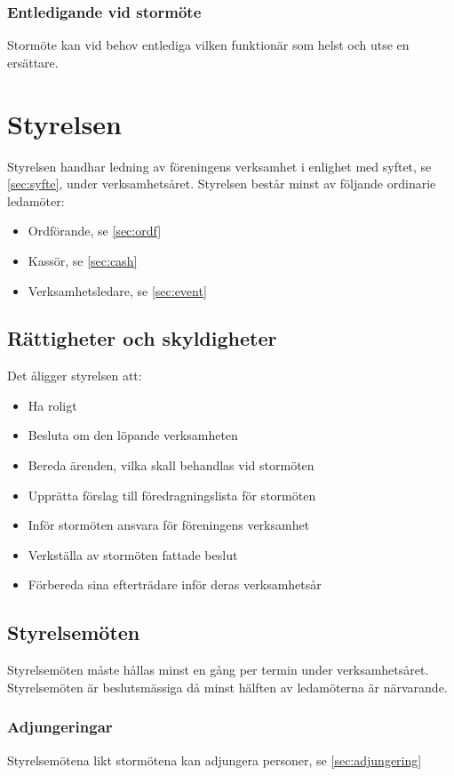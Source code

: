 \documentclass[11pt,a4paper]{article}
\begin{document}
\subsubsection{Entledigande vid stormöte}
Stormöte kan vid behov entlediga vilken funktionär som helst och utse en ersättare.

\section{Styrelsen}
Styrelsen handhar ledning av föreningens verksamhet i enlighet med syftet, se \ref{sec:syfte}, under verksamhetsåret. Styrelsen består minst av följande ordinarie ledamöter:
\begin{itemize}
	\item Ordförande, se \ref{sec:ordf}
	\item Kassör, se \ref{sec:cash}
	\item Verksamhetsledare, se \ref{sec:event}
\end{itemize}

\subsection{Rättigheter och skyldigheter}
Det åligger styrelsen att:
\begin{itemize}
	\item Ha roligt
	\item Besluta om den löpande verksamheten
	\item Bereda ärenden, vilka skall behandlas vid stormöten
	\item Upprätta förslag till föredragningslista för stormöten
	\item Inför stormöten ansvara för föreningens verksamhet
	\item Verkställa av stormöten fattade beslut
	\item Förbereda sina efterträdare inför deras verksamhetsår
\end{itemize}
\subsection{Styrelsemöten}
Styrelsemöten måste hållas minst en gång per termin under verksamhetsåret. Styrelsemöten är beslutsmässiga då minst hälften av ledamöterna är närvarande.
\subsubsection{Adjungeringar}
Styrelsemötena likt stormötena kan adjungera personer, se \ref{sec:adjungering}
\end{document}

